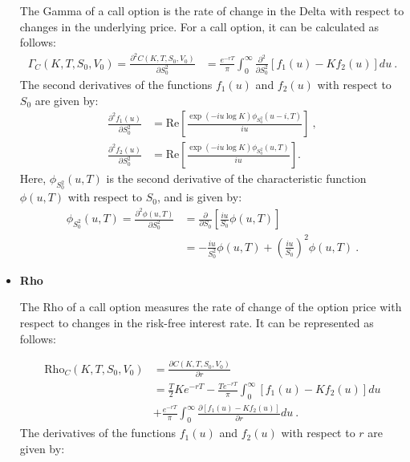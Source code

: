 \begin{itemize}
The Gamma of a call option is the rate of change in the Delta with respect to changes in the underlying price.  For a call option, it can be calculated as follows:
$$
\begin{aligned}
\Gamma_C(K,T, S_0, V_0) =
\frac{ \partial^2 C(K,T, S_0, V_0) }{\partial S_0^2} &=
 \frac{e^{-r T}}{\pi} \int_0^{\infty}\frac{ \partial^2  }{\partial S_0^2}  \left[f_1(u) - Kf_2(u)\right]du \ .
\end{aligned}
$$
The second derivatives of the functions $ f_1(u) $ and $ f_2(u) $ with respect to $ S_0 $ are given by:
\begin{equation}
\label{eq:s-derivative-s0-f1-f2}
\begin{aligned}
\frac{ \partial^2  f_1(u)   }{\partial S_0^2}&= \mathrm{Re}\left[  \frac{\exp(-iu\log K) \phi_{S_0^2}(u-i,T)   }{iu}\right]  \ , \\  
\frac{\partial^2  f_2(u)   }{\partial S_0^2 } &= \mathrm{Re}\left[ \frac{\exp(-iu\log K) \phi_{S_0^2}(u,T)  }{iu}\right].
\end{aligned}
\end{equation}
Here, $\phi_{S_0^2}(u,T)$ is the second derivative of the characteristic function $\phi(u,T)$ with respect to $S_0$, and is given by:
$$
\begin{aligned}
\phi_{S_0^2}(u,T) = \frac{ \partial^2  \phi(u,T)}{\partial S_0^2} &= \frac{\partial}{\partial S_0}  \left[ \frac{iu}{S_0} \phi(u,T)\right] \\ &= -\frac{iu}{S_0^2} \phi(u,T) + \left( \frac{iu}{S_0} \right)^2 \phi(u,T) \ .
\end{aligned}
$$




\item \textbf{Rho}

The Rho of a call option measures the rate of change of the option price with respect to changes in the risk-free interest rate. It can be represented as follows:

$$
\begin{aligned}
\text{Rho}_C(K,T, S_0, V_0) &= 
\frac{ \partial C(K,T, S_0, V_0) }{\partial r} 
\\ &=
\frac{T}{2} Ke^{-r T}  - \frac{T e^{-r T}} {\pi}\int_0^{\infty}\left[f_1(u) - Kf_2(u)\right]du 
\\&+ \frac{e^{-r T}} {\pi}\int_0^{\infty}\frac{ \partial \left[f_1(u) - Kf_2(u)\right]}{\partial r}   du \ .
\end{aligned}
$$
The derivatives of the functions $ f_1(u) $ and $ f_2(u) $ with respect to $ r $ are given by:


\end{itemize}
